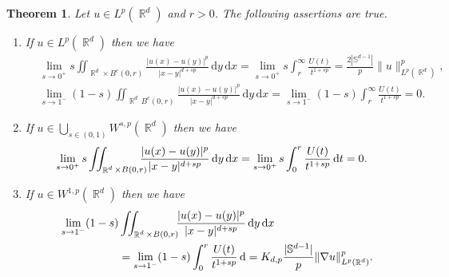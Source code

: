 \documentclass[12pt, reqno]{amsart}%
\theoremstyle{plain}  %
\newtheorem{theorem}{Theorem}[section]
\theoremstyle{definition}  %
\theoremstyle{remark}
\numberwithin{equation}{section}
\DeclareMathOperator{\R}{\mathbb{R}}
\renewcommand{\d}{\,\mathrm{d}}
\begin{document}
\begin{theorem}\label{thm:asymp-larg-short}
Let $u\in L^p(\R^d)$ and $r>0$. The  following assertions are true.
\begin{enumerate}
\item If $u\in L^p(\R^d)$ then we have
\begin{align*}
&\lim_{s\to0^+} s \iint_{\R^d\times B^c(0,r)} \frac{ |u(x) - u(y)|^p}{|x-y|^{d+s p}}\d y\d x= \lim_{s\to0^+} s\int_r^\infty \frac{U(t)}{t^{1+s p}}= \frac{2|\mathbb{S}^{d-1}|}{p}\|u\|^p_{L^p(\R^d)},\\
&\lim_{s\to1^-} (1-s) \iint_{\R^d\, B^c(0,r)} \frac{ |u(x) - u(y)|^p}{|x-y|^{d+s p}}\d y\d x= \lim_{s\to1^-} (1-s)\int_r^\infty \frac{U(t)}{t^{1+s p}}=0.
\end{align*}
\item If   $u\in \bigcup_{s\in (0,1)} W^{s, p}(\R^d)$ then we have
\begin{align*}
\lim_{s\to0^+}s\iint_{\R^d\times B(0,r)}\hspace{-2ex} \frac{ |u(x) - u(y)|^p}{|x-y|^{d+s p}}\d y \d x
&= \lim_{s\to0^+} s\int_0^r  \frac{U(t) }{t^{1+s p}}\d t=0.
\end{align*}
\item If $u\in W^{1,p}(\R^d)$ then we have
\begin{align*}
\lim_{s\to1^-}(1-s)&\iint_{\R^d \times B(0,r)}\hspace{-1ex} \frac{ |u(x) - u(y)|^p}{|x-y|^{d+s p}}\d y \d x\\
&= \lim_{s\to1^-} (1-s)\int_0^r  \frac{U(t) }{t^{1+s p}}\d =K_{d,p}\frac{|\mathbb{S}^{d-1}|}{p}\|\nabla u\|^p_{L^p(\R^d)}.
\end{align*}
\end{enumerate}
\end{theorem}
\end{document}
